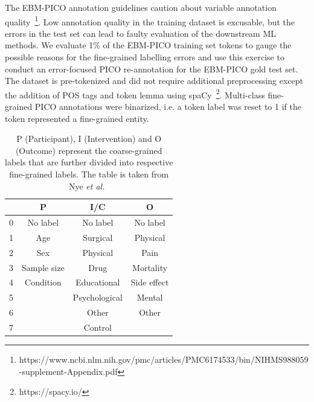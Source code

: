 \documentclass[10.7pt,]{article}
\begin{document}
The EBM-PICO annotation guidelines caution about variable annotation quality~\footnote{https://www.ncbi.nlm.nih.gov/pmc/articles/PMC6174533/bin/NIHMS988059-supplement-Appendix.pdf}.
Low annotation quality in the training dataset is excusable, but the errors in the test set can lead to faulty evaluation of the downstream ML methods.
We evaluate 1\% of the EBM-PICO training set tokens to gauge the possible reasons for the fine-grained labelling errors and use this exercise to conduct an error-focused PICO re-annotation for the EBM-PICO gold test set.
The dataset is pre-tokenized and did not require additional preprocessing except the addition of POS tags and token lemma using spaCy~\footnote{https://spacy.io/}.
Multi-class fine-grained PICO annotations were binarized, i.e. a token label was reset to 1 if the token represented a fine-grained entity.
%
\begin{table}[h!]
\begin{center}
\begin{tabular}{| c | c | c | c |} 
\hline
 & P & I/C & O \\ 
\hline
0 & No label & No label & No label \\ 
1 & Age & Surgical & Physical \\ 
2 & Sex & Physical & Pain \\
3 & Sample size & Drug & Mortality \\
4 & Condition & Educational & Side effect \\
5 &  & Psychological & Mental \\
6 &  & Other & Other \\
7 &  & Control &  \\
\hline
\end{tabular}
\caption{\label{tab:coarsefineconcept} P (Participant), I (Intervention) and O (Outcome) represent the coarse-grained labels that are further divided into respective fine-grained labels. The table is taken from Nye \textit{et al.}~\cite{nye2018corpus}}
\end{center}
\end{table}
%
\end{document}
